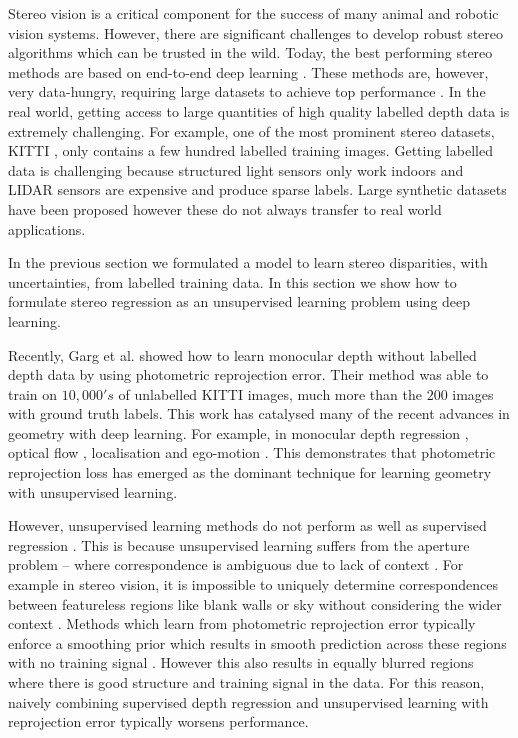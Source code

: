 Stereo vision is a critical component for the success of many animal and robotic vision systems. However, there are significant challenges to develop robust stereo algorithms which can be trusted in the wild. 
Today, the best performing stereo methods are based on end-to-end deep learning \citep{zbontar2016stereo,luo2016efficient,kendall2017end,MIFDB16}. These methods are, however, very data-hungry, requiring large datasets to achieve top performance \citep{MIFDB16}. In the real world, getting access to large quantities of high quality labelled depth data is extremely challenging. For example, one of the most prominent stereo datasets, KITTI \citep{Geiger2012CVPR}, only contains a few hundred labelled training images. Getting labelled data is challenging because structured light sensors only work indoors and LIDAR sensors are expensive and produce sparse labels. Large synthetic datasets have been proposed \citep{MIFDB16} however these do not always transfer to real world applications.

In the previous section we formulated a model to learn stereo disparities, with uncertainties, from labelled training data. In this section we show how to formulate stereo regression as an unsupervised learning problem using deep learning. 

Recently, Garg et al. \citep{garg2016unsupervised} showed how to learn monocular depth without labelled depth data by using photometric reprojection error. Their method was able to train on $10,000's$ of unlabelled KITTI images, much more than the $200$ images with ground truth labels. This work has catalysed many of the recent advances in geometry with deep learning. For example, in monocular depth regression \citep{garg2016unsupervised,monodepth17}, optical flow \citep{jason2016back,ren2017unsupervised}, localisation \citep{kendall2017posenet} and ego-motion \citep{zhou2017unsupervised}. This demonstrates that photometric reprojection loss has emerged as the dominant technique for learning geometry with unsupervised learning.

However, unsupervised learning methods do not perform as well as supervised regression \citep{garg2016unsupervised,kendall2017uncertainties}.
This is because unsupervised learning suffers from the aperture problem -- where correspondence is ambiguous due to lack of context \citep{hartley2000}. For example in stereo vision, it is impossible to uniquely determine correspondences between featureless regions like blank walls or sky without considering the wider context \citep{Hirschmuller2007}. Methods which learn from photometric reprojection error typically enforce a smoothing prior which results in smooth prediction across these regions with no training signal \citep{garg2016unsupervised,monodepth17,zhou2017unsupervised}. However this also results in equally blurred regions where there is good structure and training signal in the data. For this reason, naively combining supervised depth regression and unsupervised learning with reprojection error typically worsens performance.


